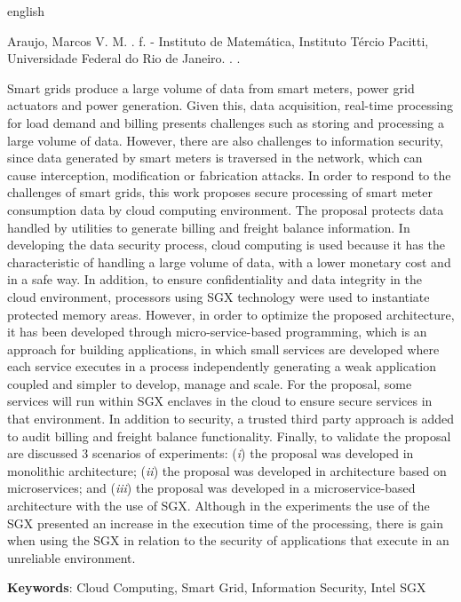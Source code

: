 \begin{resumo}[Abstract]
 \begin{otherlanguage*}{english}
   
   
   Araujo, Marcos V. M. \textbf{\imprimirtitulo}. \pageref{LastPage} f. \imprimirtipotrabalho - Instituto de Matemática, Instituto Tércio Pacitti, Universidade Federal do Rio de Janeiro. \imprimirlocal. \imprimirdata.

   Smart grids produce a large volume of data from smart meters, power grid actuators and power generation. Given this, data acquisition, real-time processing for load demand and billing presents challenges such as storing and processing a large volume of data. However, there are also challenges to information security, since data generated by smart meters is traversed in the network, which can cause interception, modification or fabrication attacks. In order to respond to the challenges of smart grids, this work proposes secure processing of smart meter consumption data by cloud computing environment. The proposal protects data handled by utilities to generate billing and freight balance information. In developing the data security process, cloud computing is used because it has the characteristic of handling a large volume of data, with a lower monetary cost and in a safe way. In addition, to ensure confidentiality and data integrity in the cloud environment, processors using SGX technology were used to instantiate protected memory areas. However, in order to optimize the proposed architecture, it has been developed through micro-service-based programming, which is an approach for building applications, in which small services are developed where each service executes in a process independently generating a weak application coupled and simpler to develop, manage and scale. For the proposal, some services will run within SGX enclaves in the cloud to ensure secure services in that environment. In addition to security, a trusted third party approach is added to audit billing and freight balance functionality. Finally, to validate the proposal are discussed 3 scenarios of experiments: (\textit{i}) the proposal was developed in monolithic architecture; (\textit{ii}) the proposal was developed in architecture based on microservices; and (\textit{iii}) the proposal was developed in a microservice-based architecture with the use of SGX. Although in the experiments the use of the SGX presented an increase in the execution time of the processing, there is gain when using the SGX in relation to the security of applications that execute in an unreliable environment.

   \vspace{\onelineskip}
 
   \noindent 
   
   \textbf{Keywords}: Cloud Computing, Smart Grid, Information Security, Intel SGX 
 \end{otherlanguage*}
\end{resumo}